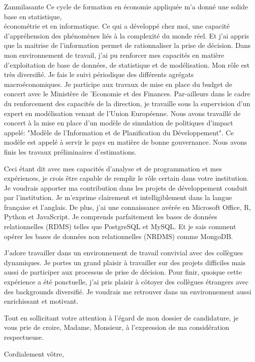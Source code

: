 \documentclass[11pt]{letter} %
\begin{document}
\begin{letter}{Zanmilasante}
	Ce cycle de formation en économie appliquée m’a donné une solide base en statistique, \\
	économétrie et en informatique. Ce qui a développé chez moi, une capacité d’appréhension des phénomènes liés à la complexité du monde réel. Et j’ai appris que la maitrise de l’information permet de rationnaliser la prise de décision. Dans mon environnement de travail, j’ai pu renforcer mes capacités en matière d’exploitation de base de données, de statistique et de modélisation. Mon rôle est très diversifié. Je fais le suivi périodique des différents agrégats macroéconomiques. Je participe aux travaux de mise en place du budget de concert avec le Ministère de ’Economie et des Finances. Par-ailleurs dans le cadre du renforcement des capacités de la direction, je travaille sous la supervision d’un expert en modélisation venant de l’Union Européenne. Nous avons travaillé de concert à la mise en place d’un modèle de simulation de politiques d’impact appelé: "Modèle de l’Information et de Planification du Développement". Ce modèle est appelé à servir le pays en matière de bonne gouvernance. Nous avons finis les travaux préliminaires d’estimations.
	
	Ceci étant dit avec mes capacités d’analyse et de programmation et mes expériences, je crois être capable de remplir le rôle certain dans votre institution. Je voudrais apporter ma contribution dans les projets de développement conduit par l’institution. Je m’exprime clairement et intelligiblement dans la langue française et l’anglais. De plus, j’ai une connaissance avérée en Microsoft Office, R, Python et JavaScript. Je comprends parfaitement les bases de données relationnelles (RDMS) telles que PostgreSQL et MySQL. Et je sais comment opérer les bases de données non relationnelles (NRDMS) comme MongoDB.
	
	J’adore travailler dans un environnement de travail convivial avec des collègues dynamiques. Je portes un grand plaisir à travailler sur des projets difficiles mais aussi de participer aux processus de prise de décision. Pour finir, quoique cette expérience a été ponctuelle, j’ai pris plaisir à côtoyer des collègues étrangers avec des backgrounds diversifié. Je voudrais me retrouver dans un environnement aussi enrichissant et motivant.
	
	
	Tout en sollicitant votre attention à l’égard de mon dossier de candidature, je vous prie de croire, Madame, Monsieur, à l’expression de ma considération respectueuse.

 


\closing{Cordialement v\^{o}tre,}




\end{letter}
\end{document}
